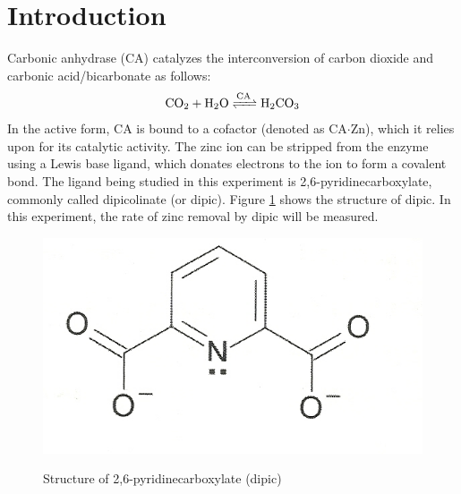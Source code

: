 \section{Introduction}
Carbonic anhydrase (CA) catalyzes the interconversion of carbon dioxide and carbonic acid/bicarbonate as follows:
\begin{align}\label{eqn:ca_reaction}
\ce{CO_2 + H_2O
<=>[\ce{CA}]
H_2CO_3}
\end{align}
In the active form, CA is bound to a  cofactor (denoted as CA$\cdot$Zn), which it relies upon for its catalytic activity. The zinc ion can be stripped from the enzyme using a Lewis base ligand, which donates electrons to the ion to form a covalent bond. The ligand being studied in this experiment is 2,6-pyridinecarboxylate, commonly called dipicolinate (or dipic). Figure \ref{fig:dipic} shows the structure of dipic. In this experiment, the rate of zinc removal by dipic will be measured.
\begin{figure}[h]
  \includegraphics[scale=0.5]{./Figures/dipic.jpg}\\
  \caption{Structure of 2,6-pyridinecarboxylate (dipic)\cite{bib:lab_manual}}\label{fig:dipic}
\end{figure}

